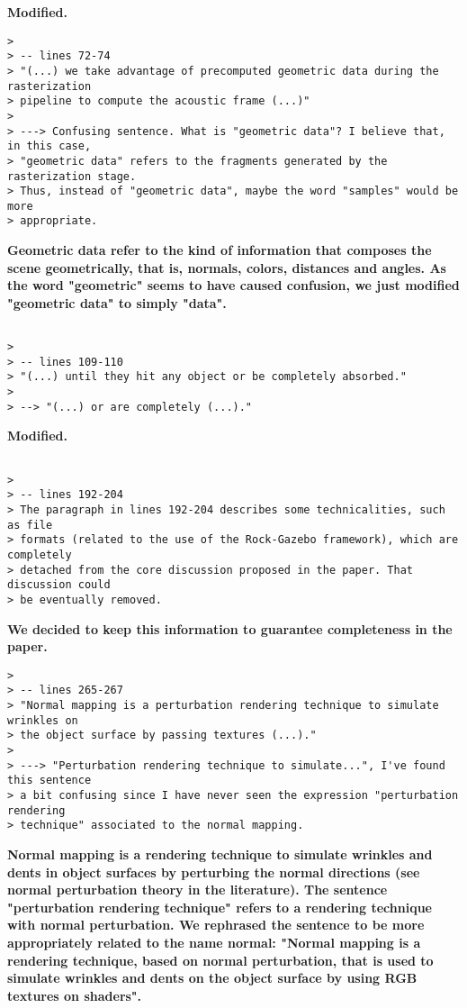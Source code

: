 \documentclass{article}
\begin{document}
\textbf{Modified.}

\begin{verbatim}
>
> -- lines 72-74
> "(...) we take advantage of precomputed geometric data during the rasterization
> pipeline to compute the acoustic frame (...)"
>
> ---> Confusing sentence. What is "geometric data"? I believe that, in this case,
> "geometric data" refers to the fragments generated by the rasterization stage.
> Thus, instead of "geometric data", maybe the word "samples" would be more
> appropriate.
\end{verbatim}

\textbf{Geometric data refer to the kind of information that composes the scene geometrically, that is, normals, colors, distances and angles. As the word "geometric" seems to have caused confusion, we just modified "geometric data" to simply "data".}

\begin{verbatim}

>
> -- lines 109-110
> "(...) until they hit any object or be completely absorbed."
>
> --> "(...) or are completely (...)."

\end{verbatim}

\textbf{Modified.}

\begin{verbatim}

>
> -- lines 192-204
> The paragraph in lines 192-204 describes some technicalities, such as file
> formats (related to the use of the Rock-Gazebo framework), which are completely
> detached from the core discussion proposed in the paper. That discussion could
> be eventually removed.
\end{verbatim}

\textbf{We decided to keep this information to guarantee completeness in the paper.}

\begin{verbatim}
>
> -- lines 265-267
> "Normal mapping is a perturbation rendering technique to simulate wrinkles on
> the object surface by passing textures (...)."
>
> ---> "Perturbation rendering technique to simulate...", I've found this sentence
> a bit confusing since I have never seen the expression "perturbation rendering
> technique" associated to the normal mapping.
\end{verbatim}

\textbf{Normal mapping is a rendering technique to simulate wrinkles and dents in object surfaces by perturbing the normal directions (see normal perturbation theory in the literature). The sentence "perturbation rendering technique" refers to a rendering technique with normal perturbation. We rephrased the sentence to be more appropriately related to the name normal: "Normal mapping is a rendering technique, based on normal perturbation, that is used to simulate wrinkles and dents on the object surface by using RGB textures on shaders".}
\end{document}
